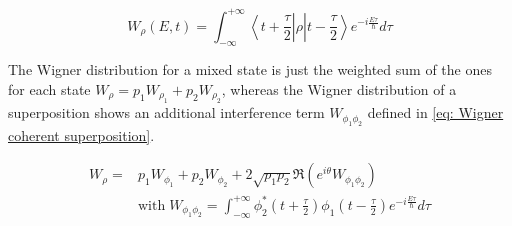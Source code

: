 \begin{equation}
W_{\rho}\left(E,t\right) = \int_{-\infty}^{+\infty} \left<t+\frac{\tau}{2}\right|\rho\left|t-\frac{\tau}{2}\right>e^{-i\frac{E\tau}{\hbar}}d\tau \label{eq: wigner density matrix}
\end{equation}

The Wigner distribution for a mixed state is just the weighted sum of the ones for each state $W_{\rho} = p_{1} W_{\rho_{1}}+p_{2} W_{\rho_{2}}$, whereas the Wigner distribution of a superposition shows an additional interference term $W_{\phi_{1}\phi_{2}}$ defined in \eqref{eq: Wigner coherent superposition}.

\begin{align}
W_{\rho} =&  p_{1} W_{\phi_{1}}+p_{2} W_{\phi_{2}} + 2\sqrt{p_{1}p_{2}}\Re\left(e^{i\theta}W_{\phi_{1}\phi_{2}}\right)\\ & \mathrm{with} \; W_{\phi_{1}\phi_{2}}=\int_{-\infty}^{+\infty} \phi_{2}^{\ast}\left(t+\frac{\tau}{2}\right)\phi_{1}\left(t-\frac{\tau}{2}\right) e^{-i\frac{E\tau}{\hbar}} d\tau \label{eq: Wigner coherent superposition}
\end{align}


